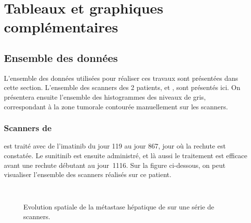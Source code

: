 \documentclass[main.tex]{subfiles}
\begin{document}

\chapter{Tableaux et graphiques complémentaires \label{chap:anx_img_complement}}

\section{Ensemble des données}
L'ensemble des données utilisées pour réaliser ces travaux sont présentées dans cette section. L'ensemble des scanners des 2 patients, \Nber et \Chen, sont présentés ici. On présentera ensuite l'ensemble des histogrammes des niveaux de gris, correspondant à la zone tumorale contourée manuellement sur les scanners.

\newpage
\subsection{Scanners de \Nber}
\Nber est traité avec de l'imatinib du jour 119 au jour 867, jour où la rechute est constatée. Le sunitinib est ensuite administré, et là aussi le traitement est efficace avant une rechute débutant au jour~1116. Sur la figure ci-dessous, on peut visualiser l'ensemble des scanners réalisés sur ce patient.

\begin{figure}[h!]
\centering\hfill
{}
\\
\caption{\label{fig:nber_complete_scan}Evolution spatiale de la métastase hépatique de \Nber sur une série de scanners.}
\vspace{-5mm}
\end{figure}
\end{document}
